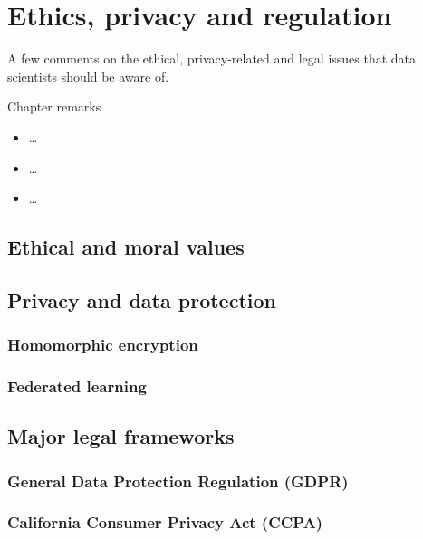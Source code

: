 \chapter{Ethics, privacy and regulation}
\label{chap:ethics}

A few comments on the ethical, privacy-related and legal issues that data scientists should be aware of.

\begin{mainbox}{Chapter remarks}


  \startcontents[chapters]
  \vspace{1em}


  \begin{itemize}
    \item \dots
  \end{itemize}


  \begin{itemize}
    \item \dots
  \end{itemize}


  \begin{itemize}
    \item \dots
  \end{itemize}
\end{mainbox}

{}
\clearpage

\section{Ethical and moral values}

\section{Privacy and data protection}

\subsection{Homomorphic encryption}

\subsection{Federated learning}

\section{Major legal frameworks}

\subsection{General Data Protection Regulation (GDPR)}

\subsection{California Consumer Privacy Act (CCPA)}
